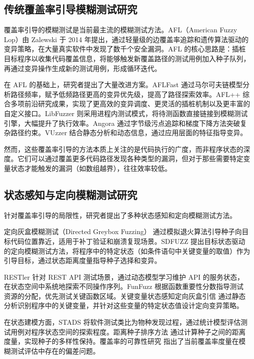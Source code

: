\documentclass[bachelor]{njupthesis}
\begin{document}
\subsection{传统覆盖率引导模糊测试研究}

覆盖率引导的模糊测试是当前最主流的模糊测试方法。AFL（American Fuzzy Lop）由 Zalewski 于 2014 年提出\cite{AFL}，通过轻量级的边覆盖率追踪和遗传算法驱动的变异策略，在大量真实软件中发现了数千个安全漏洞。AFL 的核心思路是：插桩目标程序以收集代码覆盖信息，将能够触发新覆盖路径的测试用例加入种子队列，再通过变异操作生成新的测试用例，形成循环迭代。

在 AFL 的基础上，研究者提出了大量改进方案。AFLFast\cite{AFLFAST} 通过马尔可夫链模型分析路径频率，赋予低频路径更高的变异优先级，提高了路径探索效率。AFL++\cite{AFLPLUSPLUS} 综合多项前沿研究成果，实现了更高效的变异调度、更灵活的插桩机制以及更丰富的自定义接口。LibFuzzer\cite{LIBFUZZER} 则采用进程内测试模式，将待测函数直接链接到模糊测试引擎，大幅提升了执行效率。Angora\cite{angora} 通过字节级污点追踪和梯度下降方法突破复杂路径约束。VUzzer\cite{vuzzer} 结合静态分析和动态信息，通过应用层面的特征指导变异。

然而，这些覆盖率引导的方法本质上关注的是代码执行的广度，而非程序状态的深度。它们可以通过覆盖更多代码路径发现各种类型的漏洞，但对于那些需要特定变量状态才能触发的漏洞（如数组越界），往往效率较低。

\subsection{状态感知与定向模糊测试研究}

针对覆盖率引导的局限性，研究者提出了多种状态感知和定向模糊测试方法。

定向灰盒模糊测试（Directed Greybox Fuzzing）\cite{directedGreybox} 通过模拟退火算法引导种子向目标代码位置靠近，适用于补丁验证和崩溃复现场景。SDFUZZ\cite{SDFUZZ} 提出目标状态驱动的定向模糊测试方法，将程序中的特定状态（如条件语句中关键变量的取值）作为引导目标，通过状态距离度量指导种子选择和变异。

RESTler\cite{RESTLER} 针对 REST API 测试场景，通过动态模型学习维护 API 的服务状态，在状态空间中系统地探索不同操作序列。FunFuzz\cite{FunFuzz} 根据函数重要性分数指导测试资源的分配，优先测试关键函数区域。关键变量状态感知定向灰盒引信\cite{criticalVar} 通过静态分析识别程序中的关键变量，并针对这些变量的特定状态值设计定向变异策略。

在状态建模方面，STADS\cite{STADS} 将软件测试类比为物种发现过程，通过统计模型评估测试用例对程序状态空间的探索程度。距离种子排序方法\cite{distanceSeed} 通过计算种子之间的距离度量，实现种子的多样性保持。覆盖率的可靠性研究\cite{coverageReliability} 指出了当前覆盖率度量在模糊测试评估中存在的偏差问题。
\end{document}

